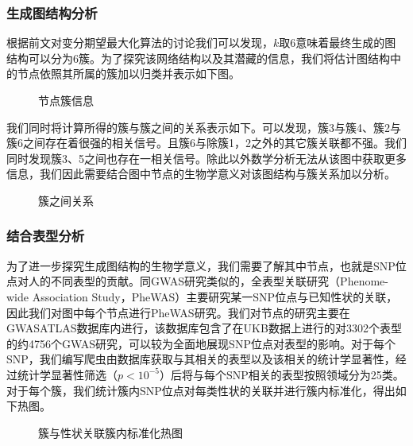 \subsubsection{生成图结构分析}

根据前文对变分期望最大化算法的讨论我们可以发现，$k$取6意味着最终生成的图结构可以分为6簇。为了探究该网络结构以及其潜藏的信息，我们将估计图结构中的节点依照其所属的簇加以归类并表示如下图。

\begin{figure}[!ht]
\centering

\caption{节点簇信息} \label{fig_ch2}
\end{figure}

我们同时将计算所得的簇与簇之间的关系表示如下。可以发现，簇3与簇4、簇2与簇6之间存在着很强的相关信号。且簇6与除簇1，2之外的其它簇关联都不强。我们同时发现簇3、5之间也存在一相关信号。除此以外数学分析无法从该图中获取更多信息，我们因此需要结合图中节点的生物学意义对该图结构与簇关系加以分析。

\begin{figure}[htbp]
\centering
\subfigure[簇之间关联图]{

}
\subfigure[簇关系邻接矩阵]{

}
\caption{簇之间关系}
\end{figure}

\subsubsection{结合表型分析}

为了进一步探究生成图结构的生物学意义，我们需要了解其中节点，也就是SNP位点对人的不同表型的贡献。同GWAS研究类似的，全表型关联研究（Phenome-wide Association Study，PheWAS）主要研究某一SNP位点与已知性状的关联\cite{pendergrass_use_2011}，因此我们对图中每个节点进行PheWAS研究。我们对节点的研究主要在GWASATLAS数据库内进行\cite{watanabe_global_2019}，该数据库包含了在UKB数据上进行的对3302个表型的约4756个GWAS研究，可以较为全面地展现SNP位点对表型的影响。对于每个SNP，我们编写爬虫由数据库获取与其相关的表型以及该相关的统计学显著性，经过统计学显著性筛选（$p<10^{-5}$）后将与每个SNP相关的表型按照领域分为25类。对于每个簇，我们统计簇内SNP位点对每类性状的关联并进行簇内标准化，得出如下热图。

\begin{figure}[htbp]
\centering

\caption{簇与性状关联簇内标准化热图} \label{fig_ch2}
\end{figure}


